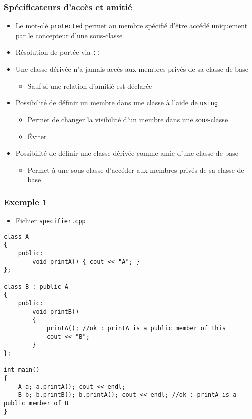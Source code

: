 \begin{frame}
\frametitle{Spécificateurs d'accès et amitié}
\begin{itemize}[<+->]
\item Le mot-clé \lstinline|protected| permet au membre spécifié d’être accédé uniquement par le concepteur d’une sous-classe
\item Résolution de portée via \texttt{::}
\item Une classe dérivée n’a jamais accès aux membres privés de sa classe de base
	\begin{itemize}
	\item Sauf si une relation d'amitié est déclarée
	\end{itemize}
\item Possibilité de définir un membre dans une classe à l'aide de \lstinline|using|
	\begin{itemize}
	\item Permet de changer la visibilité d'un membre dans une sous-classe
	\item Éviter
	\end{itemize}
\item Possibilité de définir une classe dérivée comme amie d'une classe de base
	\begin{itemize}
	\item Permet à une sous-classe d'accéder aux membres privés de sa classe de base
	\end{itemize}
\end{itemize}
\end{frame}

\begin{frame}[containsverbatim]
\frametitle{Exemple 1}
\begin{itemize}
\item Fichier \texttt{specifier.cpp}
\end{itemize}
\begin{lstlisting}
class A
{	
	public:
		void printA() { cout << "A"; }
};

class B : public A
{
	public:
		void printB() 
		{ 
			printA(); //ok : printA is a public member of this
			cout << "B";
		}
};

int main()
{
	A a; a.printA(); cout << endl;
	B b; b.printB(); b.printA(); cout << endl; //ok : printA is a public member of B
}
\end{lstlisting}
\end{frame}

